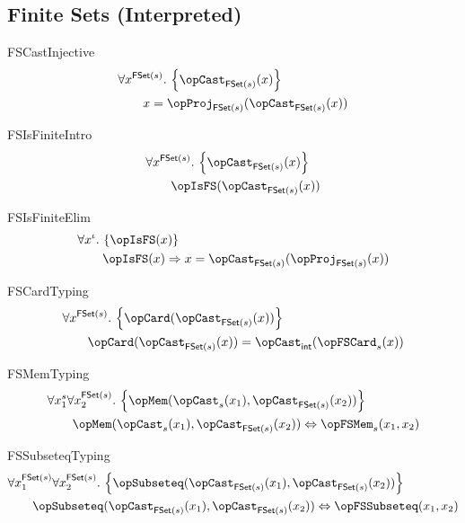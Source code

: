 \documentclass[11pt, a4paper, oneside]{article}
\begin{document}
    \subsection{Finite Sets (Interpreted)}
    \label{subsec:fsets_interpreted}

\begin{axioms}
\item[FSCastInjective] \[
        \begin{aligned}
            &\forall x^{\FSet(s)}.\, \st{ \opCast_{\FSet(s)}(x) } \\
            &\qquad x = \opProj_{\FSet(s)}(\opCast_{\FSet(s)}(x))
        \end{aligned}
    \]

\item[FSIsFiniteIntro] \[
        \begin{aligned}
            &\forall x^{\FSet(s)}.\, \st{ \opCast_{\FSet(s)}(x) } \\
            &\qquad \opIsFS(\opCast_{\FSet(s)}(x))
        \end{aligned}
    \]

\item[FSIsFiniteElim] \[
        \begin{aligned}
            &\forall x^\idv.\, \st{ \opIsFS(x) } \\
            &\qquad \opIsFS(x) \imp x = \opCast_{\FSet(s)}(\opProj_{\FSet(s)}(x))
        \end{aligned}
    \]

\item[FSCardTyping] \[
        \begin{aligned}
            &\forall x^{\FSet(s)}.\, \st{ \opCard(\opCast_{\FSet(s)}(x)) } \\
            &\qquad \opCard(\opCast_{\FSet(s)}(x)) = \opCast_\int(\opFSCard_s(x))
        \end{aligned}
    \]

\item[FSMemTyping] \[
        \begin{aligned}
            &\forall x_1^s \forall x_2^{\FSet(s)}.\, \st{ \opMem(\opCast_s(x_1), \opCast_{\FSet(s)}(x_2)) } \\
            &\qquad \opMem(\opCast_s(x_1), \opCast_{\FSet(s)}(x_2)) \eqv \opFSMem_s(x_1, x_2)
        \end{aligned}
    \]

\item[FSSubseteqTyping] \[
        \begin{aligned}
            &\forall x_1^{\FSet(s)} \forall x_2^{\FSet(s)}.\, \st{ \opSubseteq(\opCast_{\FSet(s)}(x_1), \opCast_{\FSet(s)}(x_2)) } \\
            &\qquad \opSubseteq(\opCast_{\FSet(s)}(x_1), \opCast_{\FSet(s)}(x_2)) \eqv \opFSSubseteq(x_1, x_2)
        \end{aligned}
    \]


\end{axioms}
\end{document}
